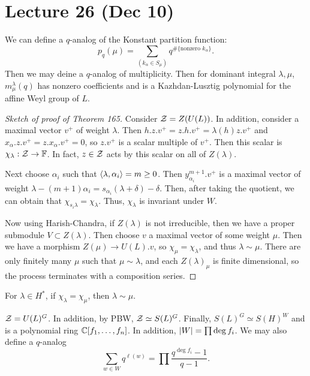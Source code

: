 \documentclass[twoside, 10pt]{article}
\newcommand{\F}{\mathbb{F}}
\begin{document}
    \section{Lecture 26 (Dec 10)}%
    \label{sec:lecture_26_dec_10_}
    
    We can define a $q$-analog of the Konstant partition function:
    \[ p_q(\mu) = \sum_{(k_{\alpha} \in S_{\mu})} q^{\# \{\text{nonzero }k_{\alpha}\}}.\]
    Then we may deine a $q$-analog of multiplicity. Then for dominant integral $\lambda, \mu$, $m_{\mu}^{\lambda}(q)$ has nonzero coefficients and is a Kazhdan-Lusztig polynomial for the affine Weyl group of $L$.

    \begin{proof}[Sketch of proof of Theorem 165]
        Consider $\mathcal{Z} = Z(U(L))$. In addition, consider a maximal vector $v^+$ of weight $\lambda$. Then $h.z.v^+ = z.h.v^+ = \lambda(h)z.v^+$ and $x_{\alpha}.z.v^+ = z.x_{\alpha}.v^+ = 0$, so $z.v^+$ is a scalar multiple of $v^+$. Then this scalar is $\chi_{\lambda}: \mc{Z} \to \F$. In fact, $z \in \mathcal{Z}$ acts by this scalar on all of $Z(\lambda)$.

        Next choose $\alpha_i$ such that $\langle\lambda, \alpha_i\rangle = m \geq 0$. Then $y_{\alpha_i}^{m+1}.v^+$ is a maximal vector of weight $\lambda - (m+1) \alpha_i = s_{\alpha_i}(\lambda + \delta) - \delta$. Then, after taking the quotient, we can obtain that $\chi_{s_i \lambda} = \chi_{\lambda}$. Thus, $\chi_{\lambda}$ is invariant under $W$.

        Now using Harish-Chandra, if $Z(\lambda)$ is not irreducible, then we have a proper submodule $V \subset Z(\lambda)$. Then choose $v$ a maximal vector of some weight $\mu$. Then we have a morphism $Z(\mu) \to U(L).v$, so $\chi_{\mu} = \chi_{\lambda}$, and thus $\lambda \sim \mu$. There are only finitely many $\mu$ such that $\mu \sim \lambda$, and each $Z(\lambda)_{\mu}$ is finite dimensional, so the process terminates with a composition series.
    \end{proof}

    \begin{thm}
        For $\lambda \in H^*$, if $\chi_{\lambda} = \chi_{\mu}$, then $\lambda \sim \mu$.
    \end{thm}
    
    \begin{rmk}
        $\mathcal{Z} = U(L)^G$. In addition, by PBW, $\mathcal{Z} \simeq S(L)^G$. Finally, $S(L)^G \simeq S(H)^W$ and is a polynomial ring $\mathbb{C}[f_1, \ldots, f_n]$. In addition, $\lvert W\rvert = \prod \deg f_i$. We may also define a $q$-analog
        \[ \sum_{w \in W} q^{\ell(w)} = \prod \frac{q^{\deg f_i} - 1}{q-1}.\]
    \end{rmk}
\end{document}
